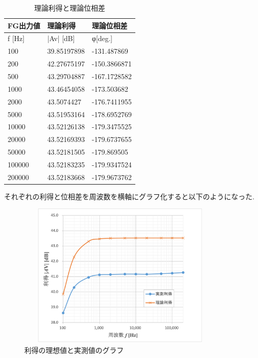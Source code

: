 \documentclass[a4j,10pt,dvipdfmx]{jarticle}
\begin{document}
\begin{table}[H]
  \label{7}
  \begin{center}
  \caption{理論利得と理論位相差}
  \begin{tabular}{|l|l|l|}
  \hline
  FG出力値&理論利得 & 理論位相差 \\ \hline
  f [Hz]&|Av| [dB] & φ[deg.] \\ \hline
  100&39.85197898 & -131.487869 \\ \hline
  200&42.27675197 & -150.3866871 \\ \hline
  500&43.29704887 & -167.1728582 \\ \hline
  1000&43.46454058 & -173.503682 \\ \hline
  2000&43.5074427 & -176.7411955 \\ \hline
  5000&43.51953164 & -178.6952769 \\ \hline
  10000&43.52126138 & -179.3475525 \\ \hline
  20000&43.52169393 & -179.6737655 \\ \hline
  50000&43.52181505 & -179.869505 \\ \hline
  100000&43.52183235 & -179.9347524 \\ \hline
  200000&43.52183668 & -179.9673762 \\ \hline
\end{tabular}
\end{center}
\end{table}
それぞれの利得と位相差を周波数を横軸にグラフ化すると以下のようになった.
\begin{figure}[H]
  \label{rito}
  \begin{center}
  \includegraphics[height=7cm,width=10cm]{ritoku.png}
  \caption{利得の理想値と実測値のグラフ}
\end{center}
\end{figure}
\end{document}
